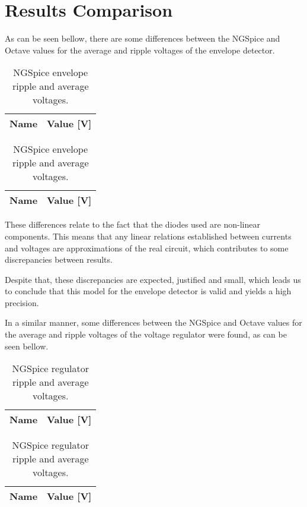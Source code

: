 \section{Results Comparison}
\label{sec:comparison}

As can be seen bellow, there are some differences between the NGSpice and Octave values for the average and ripple voltages of the envelope detector.


\begin{table}[h]
        \parbox{.45\linewidth}{
  \centering
  \begin{tabular}{|l|r|}
    \hline
    {\bf Name} & {\bf Value [V]} \\ \hline
    
  \end{tabular}
  \caption{Octave envelope ripple and average voltages.}
        \label{tab:envelopecomp}
}
\hfill
        \parbox{.45\linewidth}{
  \centering
  \begin{tabular}{|l|r|}
    \hline
    {\bf Name} & {\bf Value [V]} \\ \hline
    
  \end{tabular}
  \caption{NGSpice envelope ripple and average voltages.}
  \label{tab:envcomp}
}
\end{table}



These differences relate to the fact that the diodes used are non-linear components. This means that any linear relations established between currents and voltages are approximations of the real circuit, which contributes to some discrepancies between results.

Despite that, these discrepancies are expected, justified and small, which leads us to conclude that this model for the envelope detector is valid and yields a high precision.  

In a similar manner, some differences between the NGSpice and Octave values for the average and ripple voltages of the voltage regulator were found, as can be seen bellow.


\begin{table}[h]
        \parbox{.45\linewidth}{
  \centering
  \begin{tabular}{|l|r|}
    \hline
    {\bf Name} & {\bf Value [V]} \\ \hline
    
  \end{tabular}
  \caption{Octave regulator ripple and average voltages.}      
        \label{tab:regulatorcomp}
}
\hfill
        \parbox{.45\linewidth}{
  \centering
  \begin{tabular}{|l|r|}
    \hline
    {\bf Name} & {\bf Value [V]} \\ \hline
         
  \end{tabular}
  \caption{NGSpice regulator ripple and average voltages.}
  \label{tab:regcomp}
}
\end{table}




